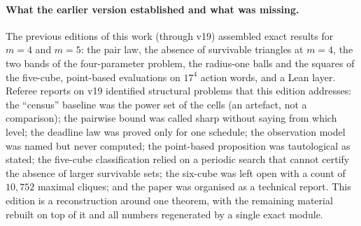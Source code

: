 \paragraph{What the earlier version established and what was missing.}
The previous editions of this work (through v19) assembled exact results for $m=4$ and $m=5$: the pair law, the absence of survivable triangles at $m=4$, the two bands of the four-parameter problem, the radius-one balls and the squares of the five-cube, point-based evaluations on $17^4$ action words, and a Lean layer. Referee reports on v19 identified structural problems that this edition addresses: the ``census'' baseline was the power set of the cells (an artefact, not a comparison); the pairwise bound was called sharp without saying from which level; the deadline law was proved only for one schedule; the observation model was named but never computed; the point-based proposition was tautological as stated; the five-cube classification relied on a periodic search that cannot certify the absence of larger survivable sets; the six-cube was left open with a count of $10{,}752$ maximal cliques; and the paper was organised as a technical report. This edition is a reconstruction around one theorem, with the remaining material rebuilt on top of it and all numbers regenerated by a single exact module.


